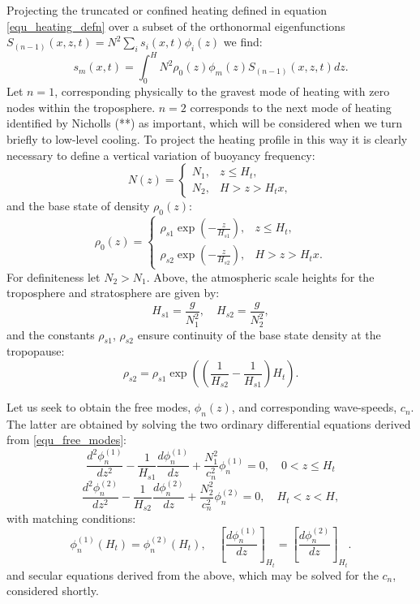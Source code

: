 \documentclass[a4paper,10pt]{article}
\begin{document}
Projecting the truncated or confined heating defined in equation \ref{equ_heating_defn} 
over a subset of the orthonormal eigenfunctions $S_{(n-1)} (x,z,t) = N^2 \sum_{i} s_i (x,t) \phi_i (z)$ we find:
%
\begin{equation}
\label{equ_s_m}
s_m (x,t) = \int_0^H N^2 \rho_0(z) \phi_m (z) S_{(n-1)} (x,z,t) dz.
\end{equation}
%
Let $n=1$, corresponding physically to the gravest mode of heating with zero nodes within the troposphere.
$n=2$ corresponds to the next mode of heating identified by Nicholls (**) as important, which will be considered when we
turn briefly to low-level cooling. To project the heating profile in this way it is clearly necessary to define a vertical variation of buoyancy frequency:
%
\begin{equation}
N(z) = 
  \begin{cases} 
     N_1, & z\leq H_t, \\
     N_2, & H>z>H_t x,
   \end{cases}
\end{equation}
%
and the base state of density $\rho_0(z)$:
%
\begin{equation}
\rho_0(z) = 
  \begin{cases} 
    \rho_{s1} \exp \left( - \frac{z}{H_{s1}} \right), & z\leq H_t, \\
    \rho_{s2} \exp \left( - \frac{z}{H_{s2}}\right) , & H>z>H_t x.
   \end{cases}
\end{equation}
%
For definiteness let $N_2 > N_1$. Above, the atmospheric scale heights for the troposphere and stratosphere are given by:
%
\begin{equation}
H_{s1} = \frac{g}{N_1^2}, \quad H_{s2} = \frac{g}{N_2^2},
\end{equation}
%
and the constants $\rho_{s1}$, $\rho_{s2}$ ensure continuity of the base state density at the tropopause:
%
\begin{equation}
\rho_{s2} = \rho_{s1} \exp \left( \left( \frac{1}{H_{s2}}  -  \frac{1}{H_{s1}} \right) H_t \right).
\end{equation}
%

Let us seek to obtain the free modes, $\phi_n(z)$, and corresponding wave-speeds, $c_n$. The latter are obtained by solving
the two ordinary differential equations derived from \ref{equ_free_modes}: 
%
\begin{equation}
\frac{d^2 \phi_n^{(1)}}{dz^2} -\frac{1}{H_{s1}} \frac{d \phi_n^{(1)}}{dz} + \frac{N_1^2}{c_n^2} \phi_n^{(1)} = 0, \quad 0< z \leq H_t 
\end{equation}
%
\begin{equation}
\frac{d^2 \phi_n^{(2)}}{dz^2} -\frac{1}{H_{s2}} \frac{d \phi_n^{(2)}}{dz} + \frac{N_2^2 }{c_n^2} \phi_n^{(2)} = 0, \quad H_t < z < H, 
\end{equation}
%
with matching conditions:
%
\begin{equation}
\label{match1}
\phi_n^{(1)}(H_t) = \phi_n^{(2)}(H_t), \quad \left[ \frac{d\phi_n^{(1)}}{dz} \right]_{H_t} = \left[ \frac{d\phi_n^{(2)}}{dz} \right]_{H_t}.
\end{equation}
%
and secular equations derived from the above, which may be solved for the $c_n$, considered shortly.
\end{document}
